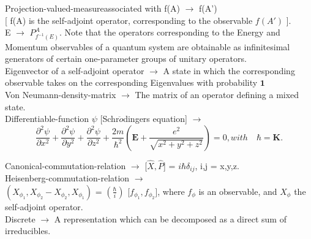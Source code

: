 \documentclass[a4paper, 10pt, onepage]{elegantbook}
\begin{document}
{Projection-valued-measureassociated with f(A) $\longrightarrow$ f(A')  \\
  
[ f(A) is the self-adjoint operator, corresponding to the observable $f(A')$ ]. \\ 

E $\rightarrow$ $P^{A}_{f^{-1}(E)}$. Note that the operators corresponding to the Energy and Momentum observables of a
quantum system are obtainable as infinitesimal generators of certain one-parameter groups of unitary operators. \\
                                                                        
Eigenvector of a self-adjoint operator $\longrightarrow$ A state in which the corresponding observable takes
on the corresponding Eigenvalues with probability $\mathbf 1$ \\
 
Von Neumann-density-matrix $\longrightarrow$ The matrix of an operator defining a mixed state.  \\
  
Differentiable-function $\psi$ [Schr$\ddot{o}$dingers equation] $\longrightarrow$
\begin{equation}
\frac{\partial^2 \psi}{\partial x^2} + \frac{\partial^2 \psi}{\partial y^2} + \frac{\partial^2 \psi}{\partial z^2} + \frac{2m}{\hbar^2} \left(\mathbf E + \frac{e^2}{\sqrt{x^2 + y^2 + z^2}}\right) = 0, with \quad \hbar = \mathbf K.
\end{equation}

Canonical-commutation-relation $\longrightarrow$ [$\hat X, \hat P$] = $i \hbar \delta_{ij}$, i,j = x,y,z.  \\

Heisenberg-commutation-relation $\longrightarrow$  \\

$(X_{\phi_1}, X_{\phi_2} - X_{\phi_2}, X_{\phi_1})$ = $(\frac{\hbar}{i})$ [$f_{\phi_1}, f_{\phi_2}]$,
where $f_\phi$ is an observable, and $X_\phi$ the self-adjoint operator.  \\

  
Discrete $\longrightarrow$ A representation which can be decomposed as a direct sum of irreducibles. \\
  
}
\end{document}
